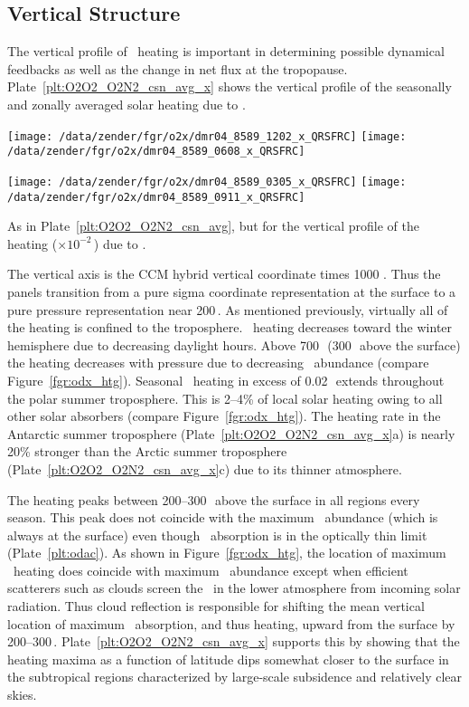 \documentclass[agupp,twoside]{aguplus} %
\newlength{\fltwdtdblclm}\setlength{\fltwdtdblclm}{41.0pc} %
\begin{document}
\subsection{Vertical Structure}\label{sxn:vrt} 
The vertical profile of \OdX\ heating is important in determining
possible dynamical feedbacks as well as the change in net flux at the
tropopause.  
Plate~\ref{plt:O2O2_O2N2_csn_avg_x} shows the vertical profile of the
seasonally and zonally averaged solar heating due to \OdX.  
\begin{plate*}
\begin{center}
\texttt{[image: /data/zender/fgr/o2x/dmr04\_8589\_1202\_x\_QRSFRC]}%
\texttt{[image: /data/zender/fgr/o2x/dmr04\_8589\_0608\_x\_QRSFRC]}%

\texttt{[image: /data/zender/fgr/o2x/dmr04\_8589\_0305\_x\_QRSFRC]}%
\texttt{[image: /data/zender/fgr/o2x/dmr04\_8589\_0911\_x\_QRSFRC]}%
\end{center}
\caption{
As in Plate~\ref{plt:O2O2_O2N2_csn_avg}, but for the vertical profile
of the heating ($\times 10^{-2}$\,\kxd) due to \OdX. 
\label{plt:O2O2_O2N2_csn_avg_x}}
\end{plate*}
The vertical axis is the CCM hybrid vertical coordinate times 1000
\cite[]{KHB98}.  
Thus the panels transition from a pure sigma coordinate
representation at the surface to a pure pressure representation near
200\,\mb. 
As mentioned previously, virtually all of the heating is confined 
to the troposphere.
\OdX\ heating decreases toward the winter hemisphere due to decreasing
daylight hours. 
Above 700\,\mb\ (300\,\mb\ above the surface) the heating decreases
with pressure due to decreasing \OdX\ abundance (compare
Figure~\ref{fgr:odx_htg}).  
Seasonal \OdX\ heating in excess of 0.02\,\kxd\ extends throughout
the polar summer troposphere.
This is 2--4\% of local solar heating owing to all other solar
absorbers (compare Figure~\ref{fgr:odx_htg}). 
The heating rate in the Antarctic summer troposphere 
(Plate~\ref{plt:O2O2_O2N2_csn_avg_x}a) is nearly 20\% stronger than
the Arctic summer troposphere (Plate~\ref{plt:O2O2_O2N2_csn_avg_x}c) 
due to its thinner atmosphere.

The heating peaks between 200--300\,\mb\ above the surface in all regions
every season. 
This peak does not coincide with the maximum \OdX\ abundance (which is
always at the surface) even though \OdX\ absorption is in the
optically thin limit (Plate~\ref{plt:odac}). 
As shown in Figure~\ref{fgr:odx_htg}, the location of maximum \OdX\
heating does coincide with maximum \OdX\ abundance except when
efficient scatterers such as clouds screen the \OdX\ in the lower
atmosphere from incoming solar radiation.  
Thus cloud reflection is responsible for shifting the mean vertical
location of maximum \OdX\ absorption, and thus heating, upward from
the surface by 200--300\,\mb.   
Plate~\ref{plt:O2O2_O2N2_csn_avg_x} supports this by showing that the
heating maxima as a function of latitude dips somewhat closer to the
surface in the subtropical regions characterized by large-scale
subsidence and relatively clear skies.
\end{document}
